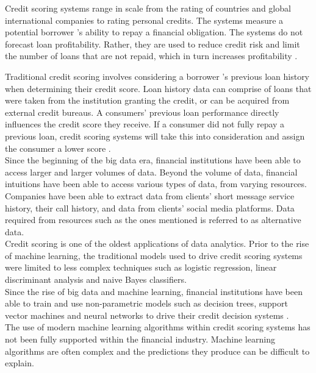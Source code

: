 Credit scoring systems range in scale from the rating of countries and global international companies to rating personal credits. The systems measure a potential borrower 's ability to repay a financial obligation. The systems do not forecast loan profitability. Rather, they are used to reduce credit risk and limit the number of loans that are not repaid, which in turn increases profitability \parencite{EarlyNNScoring}. \newpage

Traditional credit scoring involves considering a borrower 's previous loan history when determining their credit score. Loan history data can comprise of loans that were taken from the institution granting the credit, or can be acquired from external credit bureaus. A consumers' previous loan performance directly influences the credit score they receive. If a consumer did not fully repay a previous loan, credit scoring systems will take this into consideration and assign the consumer a lower score \parencite{DynamicBehaviouralScoring}. \\

Since the beginning of the big data era, financial institutions have been able to access larger and larger volumes of data. Beyond the volume of data, financial intuitions have been able to access various types of data, from varying resources. Companies have been able to extract data from clients' short message service history, their call history, and data from clients' social media platforms. Data required from resources such as the ones mentioned is referred to as alternative data.\\

Credit scoring is one of the oldest applications of data analytics. Prior to the rise of machine learning, the traditional models used to drive credit scoring systems were limited to less complex techniques such as logistic regression, linear discriminant analysis and naive Bayes classifiers.\\

Since the rise of big data and machine learning, financial institutions have been able to train and use non-parametric models such as decision trees, support vector machines and neural networks to drive their credit decision systems \parencite{IntroToCreditModelling}. \\

The use of modern machine learning algorithms within credit scoring systems has not been fully supported within the financial industry. Machine learning algorithms are often complex and the predictions they produce can be difficult to explain. \\

